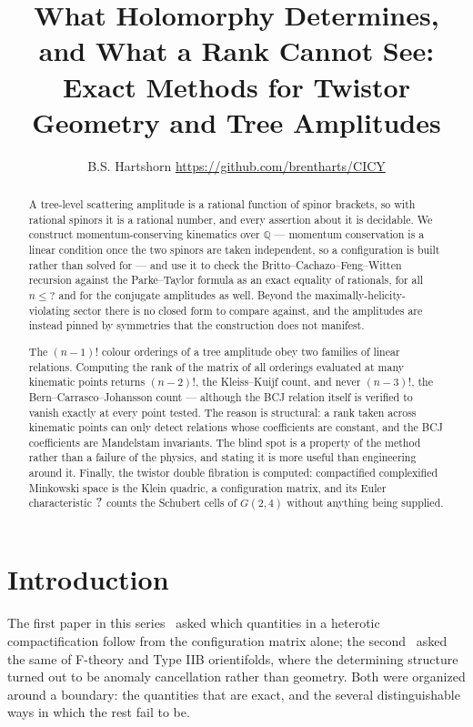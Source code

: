 \documentclass[11pt,a4paper]{article}
\title{\vspace{-1cm}\textbf{What Holomorphy Determines,\\
and What a Rank Cannot See:\\[2pt]
\large Exact Methods for Twistor Geometry and Tree Amplitudes}}
\author{B.S. Hartshorn \orcidlink{0009-0004-2853-655X} \small \url{https://github.com/brentharts/CICY}}
\newcommand{\TFBcfwMax}{?}\newcommand{\TFBcfwAgree}{?}
\newcommand{\QQ}{\mathbb{Q}}
\theoremstyle{definition}
\begin{document}
\maketitle

\begin{abstract}
A tree-level scattering amplitude is a rational function of spinor brackets, 
so with rational spinors it is a rational number, and every assertion about it is decidable. 
We construct momentum-conserving kinematics over $\QQ$ --- 
momentum conservation is a linear condition once the two spinors are
taken independent, so a configuration is built rather than solved for --- and
use it to check the Britto--Cachazo--Feng--Witten recursion against the
Parke--Taylor formula as an exact equality of rationals, for all
$n \leq \TFBcfwMax$ and for the conjugate amplitudes as well. Beyond the
maximally-helicity-violating sector there is no closed form to compare
against, and the amplitudes are instead pinned by symmetries that the construction does not manifest.

The $(n-1)!$ colour orderings of a tree amplitude
obey two families of linear relations. Computing the rank of the matrix of all
orderings evaluated at many kinematic points returns $(n-2)!$, the
Kleiss--Kuijf count, and never $(n-3)!$, the Bern--Carrasco--Johansson count
--- although the BCJ relation itself is verified to vanish exactly at every point tested. 
The reason is structural: a rank taken across kinematic points
can only detect relations whose coefficients are constant, and the BCJ
coefficients are Mandelstam invariants. The blind spot is a property of the
method rather than a failure of the physics, and stating it is more useful than engineering around it. 
Finally, the twistor double fibration is computed:
compactified complexified Minkowski space is the Klein quadric, a
configuration matrix, and its Euler characteristic
$?$ counts the Schubert cells of $G(2,4)$ without anything being supplied.
\end{abstract}

\tableofcontents


\section{Introduction}
\label{sec:intro}

The first paper in this series~\cite{SuppMath} asked which quantities in a
heterotic compactification follow from the configuration matrix alone; the
second~\cite{SuppStrings} asked the same of F-theory and Type IIB
orientifolds, where the determining structure turned out to be anomaly
cancellation rather than geometry. Both were organized around a boundary: the
quantities that are exact, and the several distinguishable ways in which the
rest fail to be.
\end{document}

